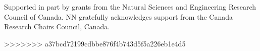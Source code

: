 \begin{acknowledgements}
Supported in part by grants from the Natural Sciences and Engineering Research Council of Canada. NN gratefully acknowledges support from the Canada Research Chairs Council, Canada.
\end{acknowledgements}
>>>>>>> a37bcd72199cdbbe876f4b743d5f5a226eb1e4d5








